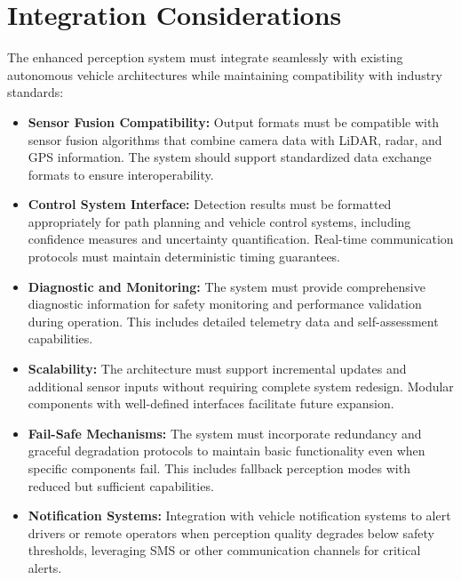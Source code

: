 \section{Integration Considerations}
\begin{doublespace}
The enhanced perception system must integrate seamlessly with existing autonomous vehicle architectures while maintaining compatibility with industry standards:

\begin{itemize}[leftmargin=*,nosep]
    \item \textbf{Sensor Fusion Compatibility:} Output formats must be compatible with sensor fusion algorithms that combine camera data with LiDAR, radar, and GPS information. The system should support standardized data exchange formats to ensure interoperability.
    
    \item \textbf{Control System Interface:} Detection results must be formatted appropriately for path planning and vehicle control systems, including confidence measures and uncertainty quantification. Real-time communication protocols must maintain deterministic timing guarantees.
    
    \item \textbf{Diagnostic and Monitoring:} The system must provide comprehensive diagnostic information for safety monitoring and performance validation during operation. This includes detailed telemetry data and self-assessment capabilities.
    
    \item \textbf{Scalability:} The architecture must support incremental updates and additional sensor inputs without requiring complete system redesign. Modular components with well-defined interfaces facilitate future expansion.
    
    \item \textbf{Fail-Safe Mechanisms:} The system must incorporate redundancy and graceful degradation protocols to maintain basic functionality even when specific components fail. This includes fallback perception modes with reduced but sufficient capabilities.
    
    \item \textbf{Notification Systems:} Integration with vehicle notification systems to alert drivers or remote operators when perception quality degrades below safety thresholds, leveraging SMS or other communication channels for critical alerts.
\end{itemize}
\end{doublespace}
